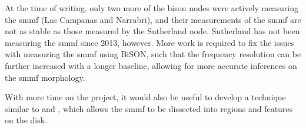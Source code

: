 At the time of writing, only two more of the \gls{bison} nodes were actively measuring the \gls{smmf} (Las Campanas and Narrabri), and their measurements of the \gls{smmf} are not as stable as those measured by the Sutherland node. Sutherland has not been measuring the \gls{smmf} since 2013, however. More work is required to fix the issues with measuring the \gls{smmf} using BiSON, such that the frequency resolution can be further increased with a longer baseline, allowing for more accurate inferences on the \gls{smmf} morphology.

With more time on the project, it would also be useful to develop a technique similar to \citet{kutsenko_contribution_2017} and \citet{bose_variability_2018}, which allows the \gls{smmf} to be dissected into regions and features on the disk.